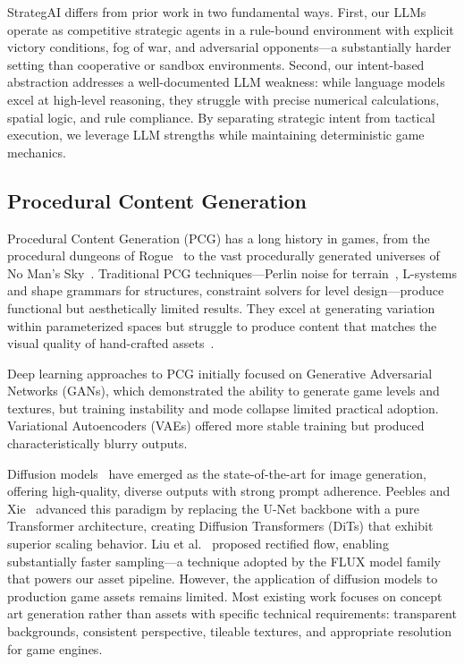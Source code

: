 \documentclass[conference]{IEEEtran}
\begin{document}
StrategAI differs from prior work in two fundamental ways. First, our LLMs
operate as competitive strategic agents in a rule-bound environment with
explicit victory conditions, fog of war, and adversarial opponents---a
substantially harder setting than cooperative or sandbox environments.
Second, our intent-based abstraction addresses a well-documented LLM
weakness: while language models excel at high-level reasoning, they
struggle with precise numerical calculations, spatial logic, and rule
compliance. By separating strategic intent from tactical execution, we
leverage LLM strengths while maintaining deterministic game mechanics.

\subsection{Procedural Content Generation}

Procedural Content Generation (PCG) has a long history in games, from the
procedural dungeons of Rogue~\cite{toy1980rogue} to the vast procedurally
generated universes of No Man's Sky~\cite{hellogames2016nomanssky}.
Traditional PCG techniques---Perlin noise for
terrain~\cite{perlin1985imagesynthesizer}, L-systems and shape grammars for
structures, constraint solvers for level design---produce functional but
aesthetically limited results. They excel at generating variation within
parameterized spaces but struggle to produce content that matches the
visual quality of hand-crafted assets~\cite{togelius2011searchbased}.

Deep learning approaches to PCG initially focused on Generative Adversarial
Networks (GANs), which demonstrated the ability to generate game levels and
textures, but training instability and mode collapse limited practical
adoption. Variational Autoencoders (VAEs) offered more stable training but
produced characteristically blurry outputs.

Diffusion models~\cite{ho2020ddpm,rombach2022ldm} have emerged as the
state-of-the-art for image generation, offering high-quality, diverse
outputs with strong prompt adherence. Peebles and
Xie~\cite{peebles2023dit} advanced this paradigm by replacing the U-Net
backbone with a pure Transformer architecture, creating Diffusion
Transformers (DiTs) that exhibit superior scaling behavior. Liu et
al.~\cite{liu2023rectifiedflow} proposed rectified flow, enabling
substantially faster sampling---a technique adopted by the FLUX model
family that powers our asset pipeline. However, the application of
diffusion models to production game assets remains limited. Most existing
work focuses on concept art generation rather than assets with specific
technical requirements: transparent backgrounds, consistent perspective,
tileable textures, and appropriate resolution for game engines.
\end{document}
